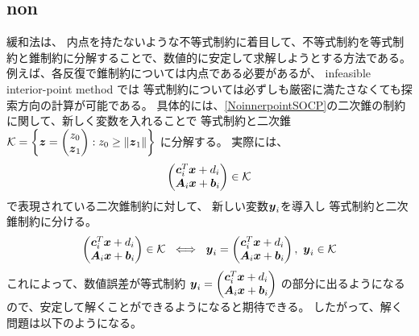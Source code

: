 \documentclass[11pt,a4paper,dvipdfmx,titlepage,uplatex]{jsarticle}
\theoremstyle{mystyle}
\newcommand{\0}{\mathbf{0}}
\def\b{\mbox{\boldmath $b$}}
\def\c{\mbox{\boldmath $c$}}
\def\x{\mbox{\boldmath $x$}}
\def\y{\mbox{\boldmath $y$}}
\def\z{\mbox{\boldmath $z$}}
\def\A{\mbox{\boldmath $A$}}
\def\KC{\mbox{$\cal K$}}
\begin{document}
\subsection{non}\label{sec:Deformation_relax}
緩和法は、
内点を持たないような不等式制約に着目して、不等式制約を等式制約と錐制約に分解することで、数値的に安定して求解しようとする方法である。
例えば、各反復で錐制約については内点である必要があるが、
infeasible interior-point method では
等式制約については必ずしも厳密に満たさなくても探索方向の計算が可能である。
具体的には、\eqref{NoinnerpointSOCP}の二次錐の制約に関して、新しく変数を入れることで
等式制約と二次錐 $\KC = \left\{ \z = \begin{pmatrix}
z_0 \\ \z_1  \end{pmatrix}: z_0 \ge \|\z_1\| \right\}$ に分解する。
実際には、
\begin{align}
  \begin{pmatrix}
  \c_i^T \x + d_i \\  \A_i \x + \b_i
\end{pmatrix} \in \KC
\end{align}
で表現されている二次錐制約に対して、
新しい変数$\y_i$を導入し
等式制約と二次錐制約に分ける。
\begin{align}
	\begin{pmatrix}
		\c_i^T \x + d_i \\  \A_i \x + \b_i
	\end{pmatrix} \in \KC
\ \iff \
  \y_i = \begin{pmatrix}
  \c_i^T \x + d_i \\  \A_i \x + \b_i
\end{pmatrix}, \ \y_i \in \KC
\end{align}
これによって、数値誤差が等式制約
$\y_i = \begin{pmatrix}
\c_i^T \x + d_i \\  \A_i \x + \b_i
\end{pmatrix}$
の部分に出るようになるので、安定して解くことができるようになると期待できる。
したがって、解く問題は以下のようになる。
\end{document}
